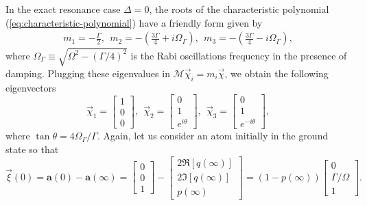 {In the exact resonance case $ \Delta = 0 $, the roots of the characteristic polynomial (\ref{eq:characteristic-polynomial}) have a friendly form given by
\begin{gather}
	m_1 = -\frac{\Gamma}{2},\ \ m_2 = - \left(\frac{3 \Gamma}{4} + i \Omega_{\Gamma} \right),\ \ m_3 = - \left(\frac{3 \Gamma}{4} - i \Omega_{\Gamma} \right),
	\label{eq:eigenvalues-damped-Rabi-oscillations}
\end{gather}
where $ \Omega_{\Gamma} \equiv \sqrt{\Omega^2 - (\Gamma / 4)^2} $ is the Rabi oscillations frequency in the presence of damping. Plugging these eigenvalues in $ \mathcal{M}\vec{\chi}_i = m_i \vec{\chi} $, we obtain the following eigenvectors
\begin{equation}
	 \vec{\chi}_1 = \left[ \begin{matrix} 1 \\ 0 \\ 0 \end{matrix} \right],\ \
	 \vec{\chi}_2 = \left[ \begin{matrix} 0 \\ 1 \\ e^{i\theta} \end{matrix} \right],\ \ 
	 \vec{\chi}_3 = \left[ \begin{matrix} 0 \\ 1 \\ e^{-i\theta} \end{matrix} \right],
	\label{eq:eigenvectors-damped-Rabi-oscillations}
\end{equation}
where $ \tan \theta = 4 \Omega_{\Gamma} / \Gamma $. Again, let us consider an atom initially in the ground state so that
\begin{equation}
	\vec{\xi}(0) = \mathbf{a}(0) - \mathbf{a}(\infty) = \left[ \begin{matrix} 0 \\ 0 \\ 1 \end{matrix} \right] - \left[ \begin{matrix} 2\Re[q(\infty)] \\ 2\Im[q(\infty)] \\ p(\infty) \end{matrix} \right] = (1 - p(\infty)) \left[ \begin{matrix} 0 \\ \Gamma / \Omega \\ 1 \end{matrix} \right].
	\label{eq:initial-conditions-damped-Rabi-oscillations}

\end{equation}}
